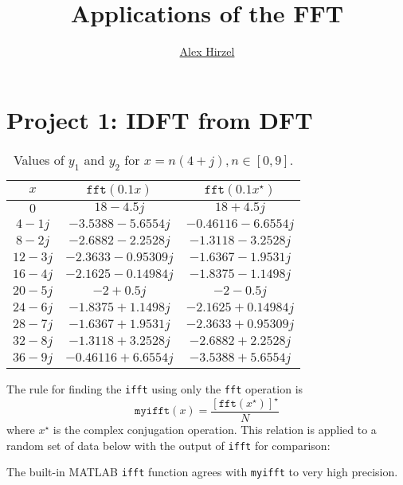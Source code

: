 \documentclass{ajhlabreport}
\title{Applications of the FFT}
\author{\href{mailto:ahirzel@mtu.edu}{Alex Hirzel}}
\begin{document}
\maketitle



\chapter{Project 1: IDFT from DFT}

\begin{table}[H]
\centering
\begin{tabular}{ccc}
$x$        & $\mathtt{fft}(0.1 x)$  & $\mathtt{fft}(0.1 x^\star)$ \\
\midrule
$0$        & $18 - 4.5j$            & $18+4.5j$            \\
$4 - 1j$   & $-3.5388 - 5.6554j$    & $-0.46116 - 6.6554j$ \\
$8 - 2j$   & $-2.6882 - 2.2528j$    & $-1.3118 - 3.2528j$  \\
$12 - 3j$  & $-2.3633 - 0.95309j$   & $-1.6367 - 1.9531j$  \\
$16 - 4j$  & $-2.1625 - 0.14984j$   & $-1.8375 - 1.1498j$  \\
$20 - 5j$  & $-2 + 0.5j$            & $-2 - 0.5j$          \\
$24 - 6j$  & $-1.8375 + 1.1498j$    & $-2.1625 + 0.14984j$ \\
$28 - 7j$  & $-1.6367 + 1.9531j$    & $-2.3633 + 0.95309j$ \\
$32 - 8j$  & $-1.3118 + 3.2528j$    & $-2.6882 + 2.2528j$  \\
$36 - 9j$  & $-0.46116 + 6.6554j$   & $-3.5388 + 5.6554j$
\end{tabular}
\caption{Values of $y_1$ and $y_2$ for $x = n(4+j), n \in [0,9]$.\label{tab:p1}}
\end{table}
%
The rule for finding the \texttt{ifft} using only the \texttt{fft} operation is
%
\begin{equation*}
\mathtt{myifft}(x) = \frac{[\mathtt{fft}(x^\star)]^\star}{N}
\end{equation*}
%
where $x^\star$ is the complex conjugation operation. This relation is applied
to a random set of data below with the output of \texttt{ifft} for comparison:
%
\begin{table}[H]
\centering
{}
\end{table}
%
\noindent{}The built-in MATLAB \texttt{ifft} function agrees with
\texttt{myifft} to very high precision.
\end{document}
